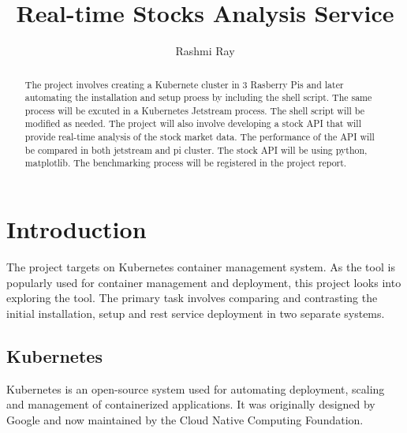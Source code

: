
\title{Real-time Stocks Analysis Service}

\author{Rashmi Ray}

\renewcommand{\shortauthors}{Uma Kugan}
\begin{abstract}
The project involves creating a Kubernete cluster in 3 Rasberry Pis and later 
automating the installation and setup proess by including the shell script.
The same process will be excuted in a Kubernetes Jetstream process. The shell
script will be modified as needed. The project will also involve developing a stock 
API that will provide real-time analysis of the stock market data. The performance
of the API will be compared in both jetstream and pi cluster. The stock API will 
be using python, matplotlib. The benchmarking process will be registered in the project report.
\end{abstract}



\maketitle

\section{Introduction}
The project targets on Kubernetes container management system. As the tool is popularly used
for container management and deployment, this project looks into exploring the tool.
The primary task involves comparing and contrasting the initial installation, 
setup and rest service deployment in two separate systems.  



\subsection{Kubernetes}
Kubernetes is an open-source system used for automating deployment, 
scaling and management of containerized applications. It was originally 
designed by Google and now maintained by the Cloud Native Computing 
Foundation.\cite{hid-sp18-417-kubernetes}

